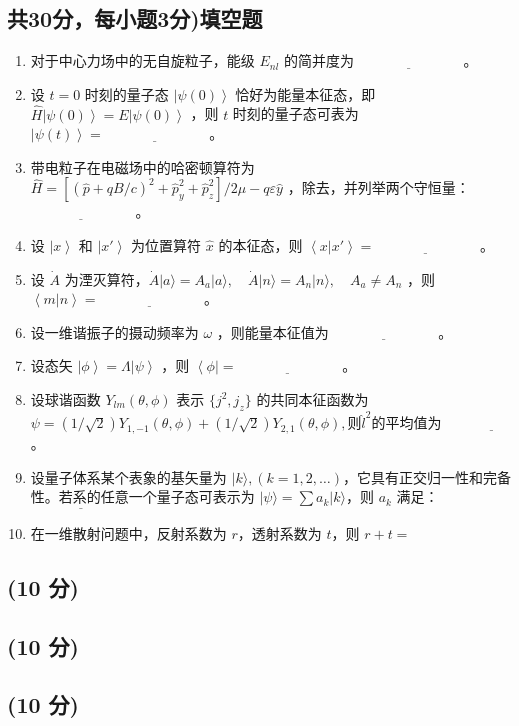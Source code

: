 \subsection{共30分，每小题3分)填空题}
\begin{enumerate}
    \item 对于中心力场中的无自旋粒子，能级 $E_{nl}$ 的简并度为 $\underline{\hspace{3cm}}$ 。
    \item 设 $t=0$ 时刻的量子态 $\left|\psi(0)\right\rangle$ 恰好为能量本征态，即 $\hat{H}\left|\psi(0)\right\rangle = E\left|\psi(0)\right\rangle$ ，则 $t$ 时刻的量子态可表为 $\left|\psi(t)\right\rangle = \underline{\hspace{3cm}}$ 。
    \item 带电粒子在电磁场中的哈密顿算符为 $\hat{H} = \left[(\hat{p} + qB/c)^2 + \hat{p}_y^2 + \hat{p}_z^2\right]/ 2\mu - q \varepsilon \hat{y}$ ，除去，并列举两个守恒量： $\underline{\hspace{3cm}}$ 。
    \item 设 $\left| x \right\rangle$ 和 $\left| x' \right\rangle$ 为位置算符 $\hat{x}$ 的本征态，则 $\left\langle x \left| x' \right\rangle\right. = \underline{\hspace{3cm}}$ 。
    \item 设 $\dot{A}$ 为湮灭算符，$\dot{A} |a\rangle = A_a |a\rangle , \quad \dot{A} |n\rangle = A_n |n\rangle , \quad A_a \neq A_n$ ，则 $\left\langle m \left| n \right\rangle\right. = \underline{\hspace{3cm}}$ 。
    \item 设一维谐振子的摄动频率为 $\omega$ ，则能量本征值为 $\underline{\hspace{3cm}}$ 。
    \item 设态矢 $\left|\phi\right\rangle =  \Lambda\left|\psi\right\rangle$ ，则 $\left\langle \phi|\right. = \underline{\hspace{3cm}}$ 。
    \item 设球谐函数 $Y_{lm}(\theta, \phi)$ 表示 $\{j^2, j_z\}$ 的共同本征函数为$\psi = (1/\sqrt{2}) Y_{1,-1}(\theta, \phi) + (1/\sqrt{2})Y_{2,1}(\theta, \phi), \text{则} \hat{l}^2 \text{的平均值为}\underline{\hspace{3cm}}$ 。
    \item 设量子体系某个表象的基矢量为 $|k\rangle, (k = 1, 2, \ldots)$，它具有正交归一性和完备性。若系的任意一个量子态可表示为 $|\psi\rangle = \sum a_k|k\rangle$，则 $a_k$ 满足：$\underline{\hspace{3cm}}$
    \item 在一维散射问题中，反射系数为 $r$，透射系数为 $t$，则 $r + t = $
\end{enumerate}
\subsection{(10 分)}

\subsection{(10 分)}

\subsection{(10 分)}